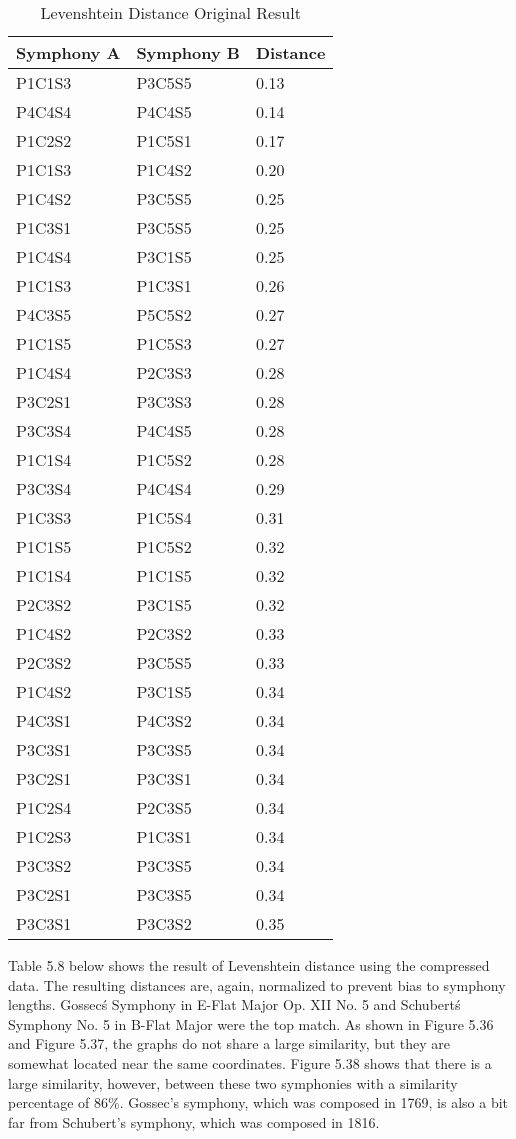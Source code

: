 \begin{longtable}{|l|l|l|}
\caption{Levenshtein Distance Original Result}
\label{my-label}\\
\hline
Symphony A & Symphony B & Distance \\ \hline
\endfirsthead
%
\endhead
%
P1C1S3 & P3C5S5 & 0.13 \\ \hline
P4C4S4 & P4C4S5 & 0.14 \\ \hline
P1C2S2 & P1C5S1 & 0.17 \\ \hline
P1C1S3 & P1C4S2 & 0.20 \\ \hline
P1C4S2 & P3C5S5 & 0.25 \\ \hline
P1C3S1 & P3C5S5 & 0.25 \\ \hline
P1C4S4 & P3C1S5 & 0.25 \\ \hline
P1C1S3 & P1C3S1 & 0.26 \\ \hline
P4C3S5 & P5C5S2 & 0.27 \\ \hline
P1C1S5 & P1C5S3 & 0.27 \\ \hline
P1C4S4 & P2C3S3 & 0.28 \\ \hline
P3C2S1 & P3C3S3 & 0.28 \\ \hline
P3C3S4 & P4C4S5 & 0.28 \\ \hline
P1C1S4 & P1C5S2 & 0.28 \\ \hline
P3C3S4 & P4C4S4 & 0.29 \\ \hline
P1C3S3 & P1C5S4 & 0.31 \\ \hline
P1C1S5 & P1C5S2 & 0.32 \\ \hline
P1C1S4 & P1C1S5 & 0.32 \\ \hline
P2C3S2 & P3C1S5 & 0.32 \\ \hline
P1C4S2 & P2C3S2 & 0.33 \\ \hline
P2C3S2 & P3C5S5 & 0.33 \\ \hline
P1C4S2 & P3C1S5 & 0.34 \\ \hline
P4C3S1 & P4C3S2 & 0.34 \\ \hline
P3C3S1 & P3C3S5 & 0.34 \\ \hline
P3C2S1 & P3C3S1 & 0.34 \\ \hline
P1C2S4 & P2C3S5 & 0.34 \\ \hline
P1C2S3 & P1C3S1 & 0.34 \\ \hline
P3C3S2 & P3C3S5 & 0.34 \\ \hline
P3C2S1 & P3C3S5 & 0.34 \\ \hline
P3C3S1 & P3C3S2 & 0.35 \\ \hline
\end{longtable}

Table 5.8 below shows the result of Levenshtein distance using the compressed data. The resulting distances are, again, normalized to prevent bias to symphony lengths. Gossec\'s Symphony in E-Flat Major Op. XII No. 5 and Schubert\'s Symphony No. 5 in B-Flat Major were the top match. As shown in Figure 5.36 and Figure 5.37, the graphs do not share a large similarity, but they are somewhat located near the same coordinates. Figure 5.38 shows that there is a large similarity, however, between these two symphonies with a similarity percentage of 86\%. Gossec's symphony, which was composed in 1769, is also a bit far from Schubert's symphony, which was composed in 1816.

